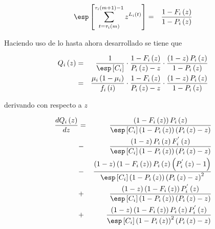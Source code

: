 \begin{eqnarray*}
\esp\left[\sum_{t=\tau_{i}\left(m\right)}^{\tau_{i}\left(m+1\right)-1}z^{L_{i}\left(t\right)}\right]&=&\frac{1-F_{i}\left(z\right)}{1-P_{i}\left(z\right)}
\end{eqnarray*}

Haciendo uso de lo hasta ahora desarrollado se tiene que

\begin{eqnarray*}
Q_{i}\left(z\right)&=&\frac{1}{\esp\left[C_{i}\right]}\cdot\frac{1-F_{i}\left(z\right)}{P_{i}\left(z\right)-z}\cdot\frac{\left(1-z\right)P_{i}\left(z\right)}{1-P_{i}\left(z\right)}\\
&=&\frac{\mu_{i}\left(1-\mu_{i}\right)}{f_{i}\left(i\right)}\cdot\frac{1-F_{i}\left(z\right)}{P_{i}\left(z\right)-z}\cdot\frac{\left(1-z\right)P_{i}\left(z\right)}{1-P_{i}\left(z\right)}
\end{eqnarray*}

derivando con respecto a $z$



\begin{eqnarray*}
\frac{d Q_{i}\left(z\right)}{d z}&=&\frac{\left(1-F_{i}\left(z\right)\right)P_{i}\left(z\right)}{\esp\left[C_{i}\right]\left(1-P_{i}\left(z\right)\right)\left(P_{i}\left(z\right)-z\right)}\\
&-&\frac{\left(1-z\right)P_{i}\left(z\right)F_{i}^{'}\left(z\right)}{\esp\left[C_{i}\right]\left(1-P_{i}\left(z\right)\right)\left(P_{i}\left(z\right)-z\right)}\\
&-&\frac{\left(1-z\right)\left(1-F_{i}\left(z\right)\right)P_{i}\left(z\right)\left(P_{i}^{'}\left(z\right)-1\right)}{\esp\left[C_{i}\right]\left(1-P_{i}\left(z\right)\right)\left(P_{i}\left(z\right)-z\right)^{2}}\\
&+&\frac{\left(1-z\right)\left(1-F_{i}\left(z\right)\right)P_{i}^{'}\left(z\right)}{\esp\left[C_{i}\right]\left(1-P_{i}\left(z\right)\right)\left(P_{i}\left(z\right)-z\right)}\\
&+&\frac{\left(1-z\right)\left(1-F_{i}\left(z\right)\right)P_{i}\left(z\right)P_{i}^{'}\left(z\right)}{\esp\left[C_{i}\right]\left(1-P_{i}\left(z\right)\right)^{2}\left(P_{i}\left(z\right)-z\right)}
\end{eqnarray*}

